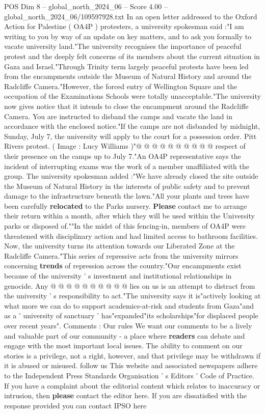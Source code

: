 \begin{textsample}{POS Dim 8 – global\_north\_2024\_06 – Score 4.00 – global\_north\_2024\_06/109597928.txt}  \label{ex:f8_pos_255}
In an open letter addressed to the Oxford Action for Palestine ( OA4P ) protesters, a university spokesman said :"I am writing to you by way of an update on key matters, and to ask you formally to vacate university land."The university recognises the importance of peaceful protest and the deeply felt concerns of its members about the current situation in Gaza and Israel."Through Trinity term largely peaceful protests have been led from the encampments outside the Museum of Natural History and around the Radcliffe Camera."However, the forced entry of Wellington Square and the occupation of the Examinations Schools were totally unacceptable."The university now gives notice that it intends to close the encampment around the Radcliffe Camera.
You are instructed to disband the camps and vacate the land in accordance with the enclosed notice."If the camps are not disbanded by midnight, Sunday, July 7, the university will apply to the court for a possession order.
Pitt Rivers protest. ( Image : Lucy Williams )"@ @ @ @ @ @ @ @ @ @ respect of their presence on the camps up to July 7."An OA4P representative says the incident of interrupting exams was the work of a member unaffiliated with the group.
The university spokesman added :"We have already closed the site outside the Museum of Natural History in the interests of public safety and to prevent damage to the infrastructure beneath the lawn."All your plants and trees have been carefully \textbf{relocated} to the Parks nursery. \textbf{Please} contact me to arrange their return within a month, after which they will be used within the University parks or disposed of.""In the midst of this fencing-in, members of OA4P were threatened with disciplinary action and had limited access to bathroom facilities.
Now, the university turns its attention towards our Liberated Zone at the Radcliffe Camera."This series of repressive acts from the university mirrors concerning \textbf{trends} of repression across the country."Our encampments exist because of the university ' s investment and institutional relationships in genocide.
Any @ @ @ @ @ @ @ @ @ @ lies on us is an attempt to distract from the university ' s responsibility to act."The university says it is"actively looking at what more we can do to support academics-at-risk and students from Gaza"and as a ' university of sanctuary ' has"expanded"its scholarships"for displaced people over recent years".
Comments : Our rules We want our comments to be a lively and valuable part of our community - a place where \textbf{readers} can debate and engage with the most important local issues.
The ability to comment on our stories is a privilege, not a right, however, and that privilege may be withdrawn if it is abused or misused. follow us This website and associated newspapers adhere to the Independent Press Standards Organisation ' s Editors ' Code of Practice.
If you have a complaint about the editorial content which relates to inaccuracy or intrusion, then \textbf{please} contact the editor here.
If you are dissatisfied with the response provided you can contact IPSO here

\end{textsample}
